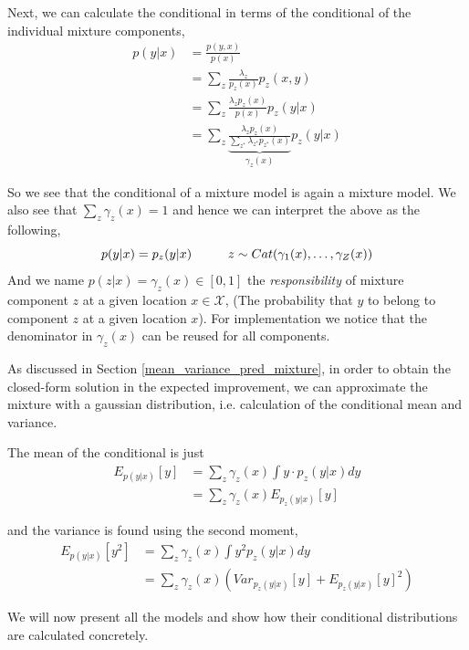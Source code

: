 Next, we can calculate the conditional in terms of the conditional of the individual mixture
components, 
\begin{align}
    p(y|x) &= \frac{p(y,x)}{p(x)}\\
    &= \sum_{z} \frac{\lambda_z}{p_z(x)} p_z(x,y)\\
    &=  \sum_{z}  \frac{\lambda_z p_z(x)}{p(x)}p_z(y|x)\\
    &=  \sum_{z}  \underbrace{ \frac{\lambda_z p_z(x)}{\sum_{z^*} \lambda_{z^*} p_{z^*}(x)}}_{\gamma_z(x)} p_z(y|x)
\end{align}

So we see that the conditional of a mixture model is again a mixture model. 
We also see that $\sum_z \gamma_z(x) = 1$ and hence we can interpret the above as the following, 
$$p(y|x) = p_z(y|x)  \hspace*{1cm} z \sim Cat(\gamma_1(x), \dots, \gamma_Z(x)) $$ And we name
$p(z|x) = \gamma_z(x) \in [0,1]$ the \textit{responsibility} of mixture component $z$ at a given
location $x \in \mathcal{X}$, (The probability that $y$ to belong to component $z$ at a given
location $x$). For implementation we notice that the denominator in $\gamma_z(x)$ can be reused for
all components. 

\begin{testexample}
    As discussed in Section \ref{mean_variance_pred_mixture}, in order to obtain the closed-form
    solution in the expected improvement, we can approximate the  mixture with a gaussian distribution, 
    i.e. calculation of the conditional mean and variance. 

    The mean of the conditional is just
    \begin{align*}
        E_{p(y|x)}[y] &= \sum_{z} \gamma_z(x) \int y \cdot p_z(y|x)dy \\
        &= \sum_{z} \gamma_z(x) E_{ p_z(y|x)}[y]
    \end{align*}

    and the variance is found using the second moment, 
    \begin{align*}
        E_{p(y|x)}[y^2] &= \sum_{z} \gamma_z(x) \int  y^2 p_{z}(y|x) dy \\
        &= \sum_{z} \gamma_z(x) (Var_{ p_z(y|x)}[y]+E_{ p_z(y|x)}[y]^2)
    \end{align*}
\end{testexample}



We will now present all the models and show how their conditional distributions are calculated concretely.

